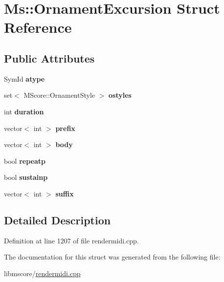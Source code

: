 \hypertarget{struct_ms_1_1_ornament_excursion}{}\section{Ms\+:\+:Ornament\+Excursion Struct Reference}
\label{struct_ms_1_1_ornament_excursion}
\subsection*{Public Attributes}
\begin{DoxyCompactItemize}
\item 
\mbox{\label{struct_ms_1_1_ornament_excursion_a22d2a50d8a0a586567aab52a5fb464a1}} 
Sym\+Id {\bfseries atype}
\item 
\mbox{\label{struct_ms_1_1_ornament_excursion_a7cdbd110f10132a6c92c7320ea1c9d8e}} 
set$<$ M\+Score\+::\+Ornament\+Style $>$ {\bfseries ostyles}
\item 
\mbox{\label{struct_ms_1_1_ornament_excursion_a3e6a5e6cfd8235f0e9ac5a4e5f3a9cb1}} 
int {\bfseries duration}
\item 
\mbox{\label{struct_ms_1_1_ornament_excursion_a3ec1ad7ebfb7ef1b47fbba24085f6c0a}} 
vector$<$ int $>$ {\bfseries prefix}
\item 
\mbox{\label{struct_ms_1_1_ornament_excursion_a628d5656122bf2f6c4e25d7d15e24347}} 
vector$<$ int $>$ {\bfseries body}
\item 
\mbox{\label{struct_ms_1_1_ornament_excursion_a434ec2abb406810b7b51a6307f9c5f4b}} 
bool {\bfseries repeatp}
\item 
\mbox{\label{struct_ms_1_1_ornament_excursion_acd8d25116ad0adf283d88f5f50dcf78e}} 
bool {\bfseries sustainp}
\item 
\mbox{\label{struct_ms_1_1_ornament_excursion_ad8504611bb02f37cc5b79a6ddee7adea}} 
vector$<$ int $>$ {\bfseries suffix}
\end{DoxyCompactItemize}


\subsection{Detailed Description}


Definition at line 1207 of file rendermidi.\+cpp.



The documentation for this struct was generated from the following file\+:\begin{DoxyCompactItemize}
\item 
libmscore/\hyperlink{rendermidi_8cpp}{rendermidi.\+cpp}\end{DoxyCompactItemize}
